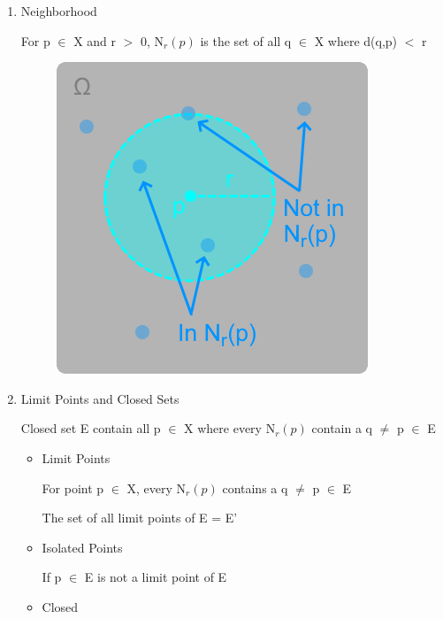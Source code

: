 	\begin{enumerate}[label=(\alph*), leftmargin=2cm, itemsep=0.1cm]
		\item {\color{lblue} Neighborhood}

			\hspace{0.5cm}
			For p $\in$ X and r $>$ 0, N$_r(p)$ is the set of all q $\in$ X
			where d(q,p) $<$ r

			\begin{figure}[h]
				\centering
				\includegraphics[scale=0.45]{Images/5.1.2a.png}
			\end{figure}

		\item {\color{lblue} Limit Points and Closed Sets}

			Closed set E contain all p $\in$ X where every N$_r(p)$ contain
			a q $\neq$ p $\in$ E

			\begin{itemize}[leftmargin=1cm, itemsep=0.1cm]
				\item Limit Points 

					\hspace{0.5cm}
					For point p $\in$ X, every N$_r(p)$ contains a
					q $\neq$ p $\in$ E

					\hspace{0.5cm}
					The set of all limit points of E = E'
				
				\item Isolated Points

					\hspace{0.5cm}
					If p $\in$ E is not a limit point of E

				\item Closed


\end{itemize}
\end{enumerate}
